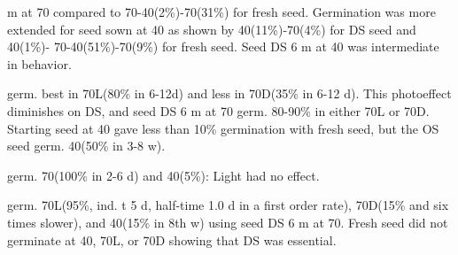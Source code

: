 \begin{description}
m at 70 compared to 70-40(2\%)-70(31\%) for fresh seed. Germination was more
extended for seed sown at 40 as shown by 40(11\%)-70(4\%) for DS seed and 40(1\%)-
70-40(51\%)-70(9\%) for fresh seed. Seed DS 6 m at 40 was intermediate in behavior.
\item[C. punctata] germ. best in 70L(80\% in 6-12d) and less in 70D(35\% in 6-12 d).
This photoeffect diminishes on DS, and seed DS 6 m at 70 germ. 80-90\% in either 70L
or 70D. Starting seed at 40 gave less than 10\% germination with fresh seed, but the
OS seed germ. 40(50\% in 3-8 w).
\item[C. pyramidalis] germ. 70(100\% in 2-6 d) and 40(5\%): Light had no effect.
\item[C. ramosissima] germ. 70L(95\%, ind. t 5 d, half-time 1.0 d in a first order rate),
70D(15\% and six times slower), and 40(15\% in 8th w) using seed DS 6 m at 70.
Fresh seed did not germinate at 40, 70L, or 70D showing that DS was essential.


\end{description}
